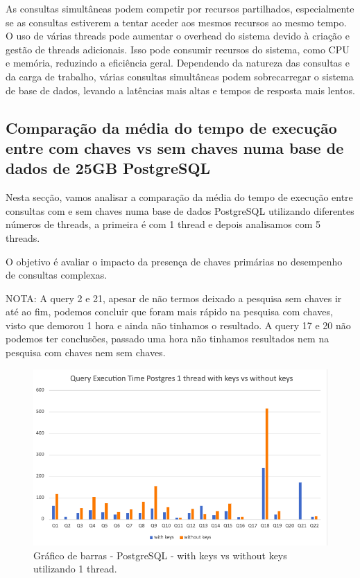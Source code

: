 \documentclass{article}
\begin{document}
\texttt{}\par As consultas simultâneas podem competir por recursos partilhados, especialmente se as consultas estiverem a tentar aceder aos mesmos recursos ao mesmo tempo.
O uso de várias threads pode aumentar o overhead do sistema devido à criação e gestão de threads adicionais. Isso pode consumir recursos do sistema, como CPU e memória, reduzindo a eficiência geral. 
Dependendo da natureza das consultas e da carga de trabalho, várias consultas simultâneas podem sobrecarregar o sistema de base de dados, levando a latências mais altas e tempos de resposta mais lentos. 
 




\clearpage
\subsection{Comparação da média do tempo de execução entre com chaves vs sem chaves numa base de dados de 25GB PostgreSQL}
\texttt{}\par Nesta secção, vamos analisar a comparação da média do tempo de execução entre consultas com e sem chaves numa base de dados PostgreSQL utilizando diferentes números de threads, a primeira é com 1 thread e depois analisamos com 5 threads.

O objetivo é avaliar o impacto da presença de chaves primárias no desempenho de consultas complexas.

NOTA: A query 2 e 21, apesar de não termos deixado a pesquisa sem chaves ir até ao fim, podemos concluir que foram mais rápido na pesquisa com chaves, visto que demorou 1 hora e ainda não tinhamos o resultado. A query 17 e 20 não podemos ter conclusões, passado uma hora não tinhamos resultados nem na pesquisa com chaves nem sem chaves.


\begin{figure}[H]
  \centering
  \includegraphics[width=\textwidth]{Graphs/postgres1thread_withkeysvswithoutkeys.png}
  \caption{Gráfico de barras - PostgreSQL - with keys vs without keys utilizando 1 thread.} 
  \label{fig:PKCreation2}
\end{figure}
\end{document}
